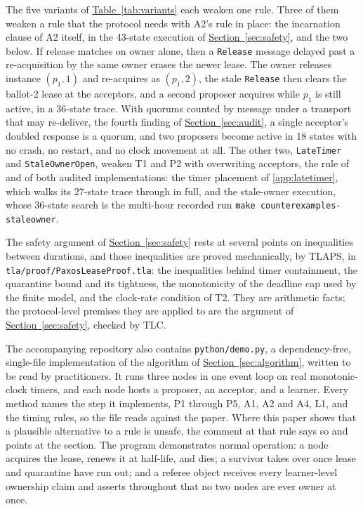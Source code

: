 \documentclass[final,5p,times,twocolumn,number]{elsarticle}
\newcommand{\code}[1]{\texttt{#1}}
\newcommand{\secref}[1]{\hyperref[#1]{Section~\ref*{#1}}}
\newcommand{\tabref}[1]{\hyperref[#1]{Table~\ref*{#1}}}
\begin{document}
The five variants of \tabref{tab:variants} each weaken one rule.  Three of them weaken a rule that the protocol needs with A2's rule in place: the incarnation clause of A2 itself, in the 43-state execution of \secref{sec:safety}, and the two below.  If release matches on owner alone, then a \code{Release} message delayed past a re-acquisition by the same owner erases the newer lease.  The owner releases instance $(p_1, 1)$ and re-acquires as $(p_1, 2)$, the stale \code{Release} then clears the ballot-2 lease at the acceptors, and a second proposer acquires while $p_1$ is still active, in a 36-state trace.  With quorums counted by message under a transport that may re-deliver, the fourth finding of \secref{sec:audit}, a single acceptor's doubled response is a quorum, and two proposers become active in 18 states with no crash, no restart, and no clock movement at all.  The other two, \code{LateTimer} and \code{StaleOwnerOpen}, weaken T1 and P2 with overwriting acceptors, the rule of \cite{ref1} and of both audited implementations: the timer placement of \ref{app:latetimer}, which walks its 27-state trace through in full, and the stale-owner execution, whose 36-state search is the multi-hour recorded run \code{make counterexamples-staleowner}.

The safety argument of \secref{sec:safety} rests at several points on inequalities between durations, and those inequalities are proved mechanically, by TLAPS, in \code{tla/proof/PaxosLeaseProof.tla}: the inequalities behind timer containment, the quarantine bound and its tightness, the monotonicity of the deadline cap used by the finite model, and the clock-rate condition of T2.  They are arithmetic facts; the protocol-level premises they are applied to are the argument of \secref{sec:safety}, checked by TLC.

The accompanying repository also contains \code{python/demo.py}, a dependency-free, single-file implementation of the algorithm of \secref{sec:algorithm}, written to be read by practitioners.  It runs three nodes in one event loop on real monotonic-clock timers, and each node hosts a proposer, an acceptor, and a learner.  Every method names the step it implements, P1 through P5, A1, A2 and A4, L1, and the timing rules, so the file reads against the paper.  Where this paper shows that a plausible alternative to a rule is unsafe, the comment at that rule says so and points at the section.  The program demonstrates normal operation: a node acquires the lease, renews it at half-life, and dies; a survivor takes over once lease and quarantine have run out; and a referee object receives every learner-level ownership claim and asserts throughout that no two nodes are ever owner at once.
\end{document}
